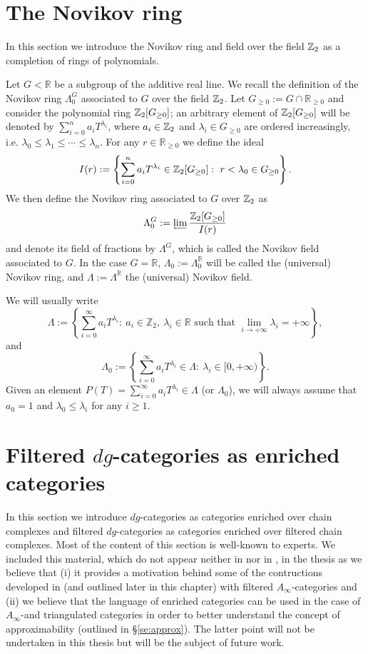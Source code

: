 

\section{The Novikov ring}\label{intro:novikov}
In this section we introduce the Novikov ring and field over the field $\mathbb{Z}_2$ as a completion of rings of polynomials. 

Let $G<\mathbb R$ be a subgroup of the additive real line. We recall the definition of the Novikov ring $\Lambda^G_0$ associated to $G$ over the field $\mathbb{Z}_2$. Let $G_{\geq 0}:= G\cap \mathbb{R}_{\geq 0}$ and consider the polynomial ring $\mathbb{Z}_2[G_{\geq 0}]$; an arbitrary element of $\mathbb{Z}_2[G_{\geq 0}]$ will be denoted by $\sum_{i=0}^n a_iT^{\lambda_i}$, where $a_i\in \mathbb{Z}_2$ and $\lambda_i\in G_{\geq 0}$ are ordered increasingly, i.e. $\lambda_0\leq \lambda_1\leq \cdots\leq\lambda_n$. For any $r\in \mathbb{R}_{\geq 0}$ we define the ideal $$I(r):= \left\{\sum_{i=0}^na_iT^{\lambda_i}\in \Z_2[G_{\geq 0}] : \ r<\lambda_0\in G_{\geq 0}\right\}.$$ We then define the Novikov ring associated to $G$ over $\mathbb{Z}_2$ as $$\Lambda^G_0:=\varprojlim \frac{\Z_2[G_{\geq 0}]}{I(r)}$$ and denote its field of fractions by $\Lambda^G$, which is called the Novikov field associated to $G$. In the case $G=\mathbb{R}$, $\Lambda_0:=\Lambda_0^\mathbb{R}$ will be called the (universal) Novikov ring, and $\Lambda:=\Lambda^{\mathbb{R}}$ the (universal) Novikov field.

We will usually write $$\Lambda:= \left\{\sum_{i=0}^\infty a_iT^{\lambda_i}: \ a_i\in \mathbb{Z}_2, \ \lambda_i\in \mathbb{R} \text{ such that } \lim_{i\to + \infty}\lambda_i=+\infty\right\},$$ and $$\Lambda_0:= \left\{\sum_{i=0}^\infty a_iT^{\lambda_i}\in \Lambda:\ \lambda_i\in [0,+\infty)\right\}.$$ Given an element $P(T)=\sum_{i=0}^\infty a_iT^{\lambda_i}\in \Lambda$ (or $\Lambda_0$), we will always assume that $a_0=1$ and $\lambda_0\leq \lambda_i$ for any $i\geq 1$.




\section{Filtered $dg$-categories as enriched categories}\label{se:cch}


In this section we introduce $dg$-categories as categories enriched over chain complexes and filtered $dg$-categories as categories enriched over filtered chain complexes. Most of the content of this section is well-known to experts. We included this material, which do not appear neither in \cite{Amb:fil-fuk} nor in \cite{ABC26}, in the thesis as we believe that (i) it provides a motivation behind some of the contructions developed in \cite{ABC26} (and outlined later in this chapter) with filtered $A_\infty$-categories and (ii) we believe that the language of enriched categories can be used in the case of $A_\infty$-and triangulated categories in order to better understand the concept of approximability (outlined in \S\ref{se:approx}). The latter point will not be undertaken in this thesis but will be the subject of future work.

